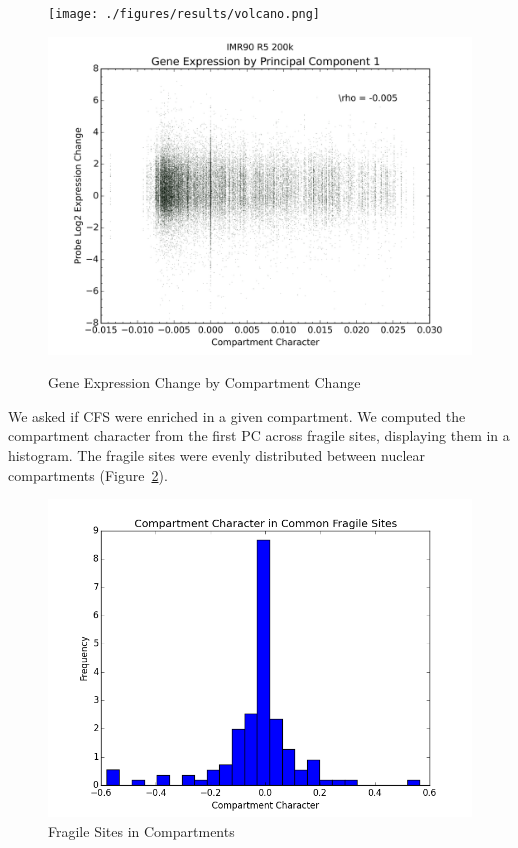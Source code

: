 \begin{figure}[H]
  \caption{Gene Expression Change by Compartment Change}
  \begin{minipage}[b]{0.5\textwidth}\label{fig:expressionChangeByCompartmentChange}
    \texttt{[image: ./figures/results/volcano.png]}
  \end{minipage}%
  \hfill
  \begin{minipage}[b]{0.5\textwidth}\label{fig:expressionChangeByCompartment}
    \includegraphics[width=\textwidth]{./figures/results/compartment_ir5_200k.png}
  \end{minipage}
\end{figure}

We asked if \gls{CFS} were enriched in a given compartment.  We computed the compartment character from the first \gls{PC} across fragile
sites, displaying them in a histogram.  The fragile sites were evenly distributed between nuclear compartments (Figure~\ref{fig:compartmentCFS}).

\begin{figure}[H]
  \centering
  \caption{Fragile Sites in Compartments}\label{fig:compartmentCFS}
  \includegraphics[width=\textwidth]{./figures/results/cfs.png}
\end{figure}


